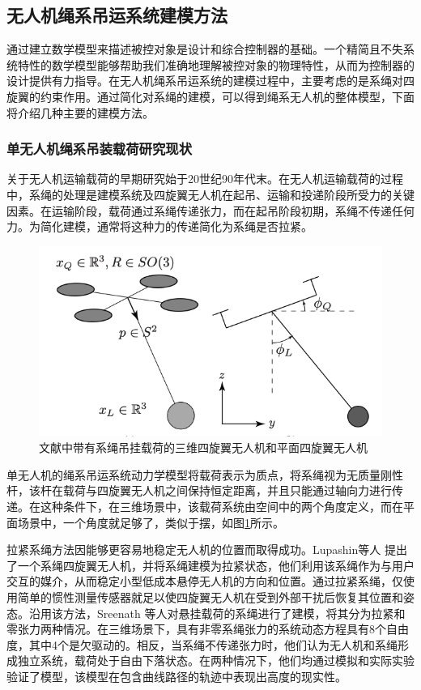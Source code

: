 \documentclass[lang=chs, degree=master, blindreview=false, winfonts=true]{yanputhesis}
\begin{document}
\subsection{无人机绳系吊运系统建模方法}
通过建立数学模型来描述被控对象是设计和综合控制器的基础。一个精简且不失系统特性的数学模型能够帮助我们准确地理解被控对象的物理特性，从而为控制器的设计提供有力指导。在无人机绳系吊运系统的建模过程中，主要考虑的是系绳对四旋翼的约束作用。通过简化对系绳的建模，可以得到绳系无人机的整体模型，下面将介绍几种主要的建模方法。
\subsubsection{单无人机绳系吊装载荷研究现状}
关于无人机运输载荷的早期研究始于20世纪90年代末\cite{oshman1999mini,borky1997payload}。在无人机运输载荷的过程中，系绳的处理是建模系统及四旋翼无人机在起吊、运输和投递阶段所受力的关键因素\cite{qian2020guidance}。在运输阶段，载荷通过系绳传递张力，而在起吊阶段初期，系绳不传递任何力\cite{guo2020controlling}。为简化建模，通常将这种力的传递简化为系绳是否拉紧\cite{tang2018aggressive}。

\begin{figure}[hbt!]
	\centering
	\includegraphics[width=28pc]{picture/1_1.png} 
	\caption{文献中带有系绳吊挂载荷的三维四旋翼无人机和平面四旋翼无人机} \label{1_1}
\end{figure}
单无人机的绳系吊运系统动力学模型将载荷表示为质点，将系绳视为无质量刚性杆，该杆在载荷与四旋翼无人机之间保持恒定距离，并且只能通过轴向力进行传递。在这种条件下，在三维场景中，该载荷系统由空间中的两个角度定义，而在平面场景中，一个角度就足够了，类似于摆\cite{sun2021novel}，如图\ref{1_1}所示。


拉紧系绳方法因能够更容易地稳定无人机的位置而取得成功。Lupashin等人 \cite{lupashin2013stabilization} 提出了一个系绳四旋翼无人机，并将系绳建模为拉紧状态，他们利用该系绳作为与用户交互的媒介，从而稳定小型低成本悬停无人机的方向和位置。通过拉紧系绳，仅使用简单的惯性测量传感器就足以使四旋翼无人机在受到外部干扰后恢复其位置和姿态。沿用该方法，Sreenath 等人\cite{sreenath2013trajectory}对悬挂载荷的系绳进行了建模，将其分为拉紧和零张力两种情况。在三维场景下，具有非零系绳张力的系统动态方程具有8个自由度，其中4个是欠驱动的。相反，当系绳不传递张力时，他们认为无人机和系绳形成独立系统，载荷处于自由下落状态。在两种情况下，他们均通过模拟和实际实验验证了模型，该模型在包含曲线路径的轨迹中表现出高度的现实性。
\end{document}
